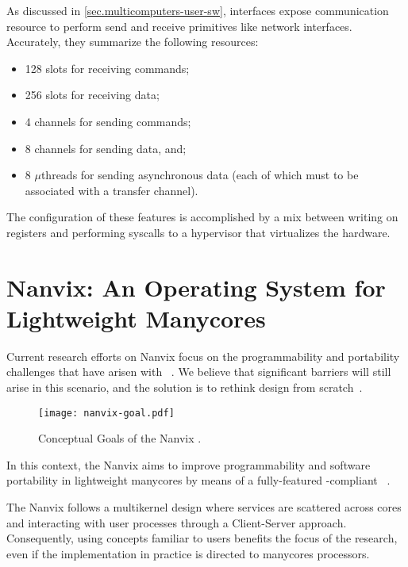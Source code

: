 	As discussed in \autoref{sec.multicomputers-user-sw}, \noc interfaces
	expose communication resource to perform send and receive primitives
	like network interfaces.
	Accurately, they summarize the following resources:

	\begin{itemize}
		\item 128 slots for receiving commands;
		\item 256 slots for receiving data;
		\item 4 channels for sending commands;
		\item 8 channels for sending data, and;
		\item 8 $\mu$threads for sending asynchronous data (each of which must
			to be associated with a transfer channel).
	\end{itemize}

	The configuration of these features is accomplished by a mix between
	writing on \dma registers and performing syscalls to a hypervisor
	that virtualizes the \mppa hardware.

\section{Nanvix: An Operating System for Lightweight Manycores}
\label{sec.nanvix}

	Current research efforts on Nanvix \os focus on the programmability and portability
	challenges that have arisen with \lightweight \manycores~\cite{christgau2017, gamell2012, serres2011}.
	We believe that significant barriers will still arise in this scenario, and the
	solution is to rethink \os design from scratch~\cite{penna:compas19, penna2019}.

	\begin{figure}[!tb]
		\centering%
		\caption{Conceptual Goals of the Nanvix \os.}%
		\label{fig:nanvix-goal}%
		\texttt{[image: nanvix-goal.pdf]}%
	\end{figure}


	In this context, the Nanvix \os aims to improve programmability and
	software portability in lightweight manycores by means of a fully-featured
	\posix-compliant \os~\cite{penna:compas19}.

	The Nanvix \os follows a multikernel design where \os services are scattered across cores and
	interacting with user processes through a Client-Server approach.
	Consequently, using concepts familiar to \os users benefits the focus of the research,
	even if the implementation in practice is directed to manycores processors.

